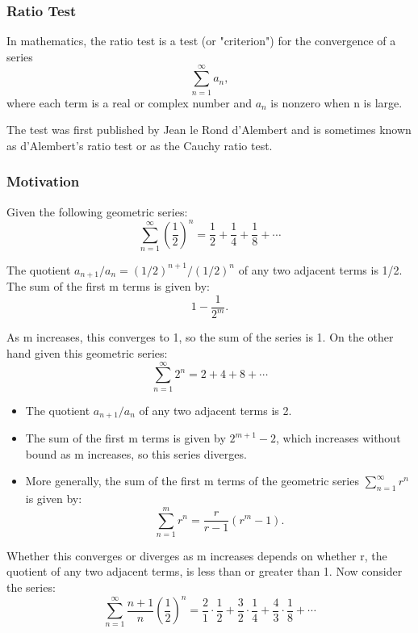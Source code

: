 \documentclass{beamer}
\begin{document}
\begin{frame}
	\frametitle{Ratio Test}
	In mathematics, the ratio test is a test (or "criterion") for the convergence of a series 
	\[ \sum_{n=1}^\infty a_n,\] where each term is a real or complex number and $a_n$ is nonzero when n is large. 
	
	The test was first published by Jean le Rond d'Alembert and is sometimes known as d'Alembert's ratio test or as the Cauchy ratio test.
\end{frame}
\begin{frame}
	\frametitle{Motivation}
	Given the following geometric series:
	\[ \sum_{n=1}^\infty \left(\frac{1}{2}\right)^n = \frac{1}{2} + \frac{1}{4} + \frac{1}{8} + \cdots\]
	
	The quotient $ a_{n+1}/a_n = (1/2)^{n+1}/(1/2)^n$ of any two adjacent terms is 1/2. 
	The sum of the first m terms is given by:
	\[1 - \frac{1}{2^m}.\]
\end{frame}
\begin{frame}
	As m increases, this converges to 1, so the sum of the series is 1. On the other hand given this geometric series:
	\[\sum_{n=1}^\infty 2^n = 2 + 4 + 8 + \cdots\]
	
\end{frame}
\begin{frame}
	\begin{itemize}
		\item The quotient $a_{n+1}/a_n$ of any two adjacent terms is 2. 
		\item The sum of the first m terms is given by
		$2^{m+1} - 2$,
		which increases without bound as m increases, so this series diverges. 
		\item More generally, the sum of the first m terms of the geometric series $\sum_{n=1}^\infty r^n$ is given by:
		\[\sum_{n=1}^{m} r^n = \frac{r}{r-1} (r^m - 1).\]
	\end{itemize}
\end{frame}
\begin{frame}
	Whether this converges or diverges as m increases depends on whether r, the quotient of any two adjacent terms, is 
	less than or greater than 1. Now consider the series:
	\[\sum_{n=1}^\infty \frac{n+1}{n} \left(\frac{1}{2}\right)^n = \frac{2}{1} \cdot \frac{1}{2} + \frac{3}{2} \cdot \frac{1}{4} + \frac{4}{3} \cdot \frac{1}{8} + \cdots\]
\end{frame}
\end{document}

